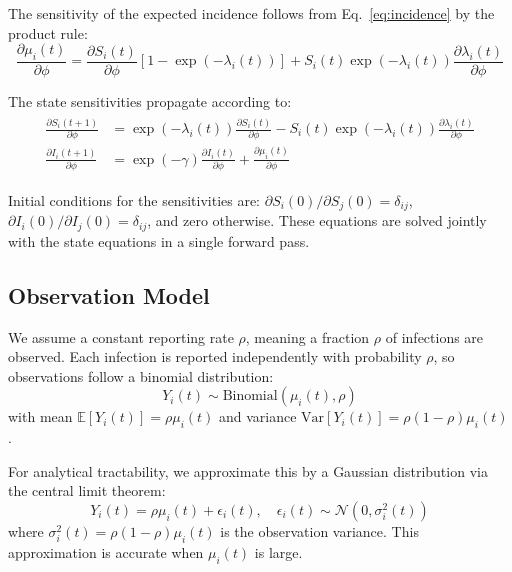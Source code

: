 The sensitivity of the expected incidence follows from
Eq.~\eqref{eq:incidence} by the product rule:
\begin{equation}\label{eq:sens_mu}
\frac{\partial \mu_i(t)}{\partial \phi} =
\frac{\partial S_i(t)}{\partial \phi} \left[1 - \exp(-\lambda_i(t))\right]
+ S_i(t) \exp(-\lambda_i(t)) \frac{\partial \lambda_i(t)}{\partial \phi}
\end{equation}

The state sensitivities propagate according to:
\begin{align}\begin{split}\label{eq:sens}
\frac{\partial S_i(t+1)}{\partial \phi} &= \exp(-\lambda_i(t))
\frac{\partial S_i(t)}{\partial \phi} - S_i(t) \exp(-\lambda_i(t))
\frac{\partial \lambda_i(t)}{\partial \phi} \\
\frac{\partial I_i(t+1)}{\partial \phi} &= \exp(-\gamma)
\frac{\partial I_i(t)}{\partial \phi} +
\frac{\partial \mu_i(t)}{\partial \phi}
\end{split}\end{align}

Initial conditions for the sensitivities are: $\partial
S_i(0)/\partial S_j(0) = \delta_{ij}$, $\partial I_i(0)/\partial
I_j(0) = \delta_{ij}$, and zero otherwise.  These equations are solved
jointly with the state equations in a single forward pass.


\subsection*{Observation Model}

We assume a constant reporting rate $\rho$, meaning a fraction $\rho$
of infections are observed. Each infection is reported independently
with probability $\rho$, so observations follow a binomial
distribution:
\begin{equation}\label{eq:obs_binomial}
Y_i(t) \sim \text{Binomial}(\mu_i(t), \rho)
\end{equation}
with mean $\mathbb{E}[Y_i(t)] = \rho \mu_i(t)$ and variance
$\text{Var}[Y_i(t)] = \rho(1-\rho) \mu_i(t)$.

For analytical tractability, we approximate this by a Gaussian
distribution via the central limit theorem:
\begin{equation}\label{eq:obs_gaussian}
Y_i(t) = \rho \mu_i(t) + \epsilon_i(t), \quad
\epsilon_i(t) \sim \mathcal{N}(0, \sigma_i^2(t))
\end{equation}
where $\sigma_i^2(t) = \rho(1-\rho)\mu_i(t)$ is the observation variance.
This approximation is accurate when $\mu_i(t)$ is large.

